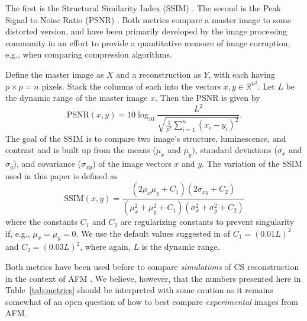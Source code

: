 \documentclass[11pt]{article}
\begin{document}
The first is the Structural Similarity Index (SSIM) \cite{wang_image_2004}. The second is the Peak Signal to Noise Ratio (PSNR) \cite{Luo_nano_2015}. Both metrics compare a master image to some distorted version, and have been primarily developed by the image processing community in an effort to provide a quantitative measure of image corruption, e.g., when comparing compression algorithms.

Define the master image as $X$ and a reconstruction as $Y$, with each having $p\times p=n$ pixels. Stack the columns of each into the vectors $x, y\in\mathbb{R}^{n^2}$. Let $L$ be the dynamic range of the master image $x$. Then the PSNR is given by
\begin{equation*}
  \text{PSNR}(x,y) = 10\log_{10}\frac{L^2}
  {\sqrt{\frac{1}{p^2} \sum_{i=1}^{n}( x_{i} - y_{i})^2}}.
\end{equation*}
The goal of the SSIM is to compare two image's structure, luminescence, and contrast and is built up from the means ($\mu_x$ and $\mu_y$), standard deviations ($\sigma_x$ and $\sigma_y$), and covariance ($\sigma_{xy}$) of the image vectors $x$ and $y$.  
The variation of the SSIM used in this paper is defined as
\begin{equation*}
  \text{SSIM}(x,y) = \frac{(2\mu_x\mu_y + C_1)(2\sigma_{xy}+C_2)}
  {(\mu_x^2 + \mu_y^2 + C_1)(\sigma_x^2 + \sigma_y^2 + C_2)}
\end{equation*}
where the constants $C_1$ and $C_2$ are regularizing constants to prevent singularity if, e.g., $\mu_x=\mu_y=0$. We use the default values suggested in \cite{wang_image_2004} of $C_1=(0.01L)^2$ and ${C_2=(0.03L)^2}$, where again, $L$ is the dynamic range.

Both metrics have been used before to compare \emph{simulations} of CS reconstruction in the context of AFM \cite{oxvig_structure_2017, Luo_nano_2015}. We believe, however, that the numbers presented here in Table~\ref{tab:metrics} should be interpreted with some caution as it remains somewhat of an open question of how to best compare \emph{experimental} images from AFM.
\end{document}
